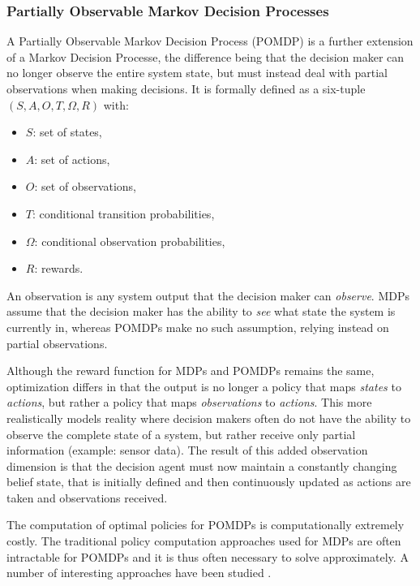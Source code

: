 \subsubsection{Partially Observable Markov Decision Processes}

A Partially Observable Markov Decision Process (POMDP) is a further extension of a Markov Decision Processe, the difference being that the decision maker can no longer observe the entire system state, but must instead deal with partial observations when making decisions. It is formally defined as a six-tuple $(S,A,O,T,\Omega,R)$ with:
\begin{itemize}
\item $S$: set of states,
\item $A$: set of actions,
\item $O$: set of observations,
\item $T$: conditional transition probabilities,
\item $\Omega$: conditional observation probabilities,
\item $R$: rewards.
\end{itemize}


An observation is any system output that the decision maker can \textit{observe}. MDPs assume that the decision maker has the ability to \textit{see} what state the system is currently in, whereas POMDPs make no such assumption, relying instead on partial observations.


Although the reward function for MDPs and POMDPs remains the same, optimization differs in that the output is no longer a policy that maps \textit{states} to \textit{actions}, but rather a policy that maps \textit{observations} to \textit{actions}. This more realistically models reality where decision makers often do not have the ability to observe the complete state of a system, but rather receive only partial information (example: sensor data). The result of this added observation dimension is that the decision agent must now maintain a constantly changing belief state, that is initially defined and then continuously updated as actions are taken and observations received.

The computation of optimal policies for POMDPs is computationally extremely costly. The traditional policy computation approaches used for MDPs are often intractable for POMDPs and it is thus often necessary to solve approximately. A number of interesting approaches have been studied \cite{Hansen98}.